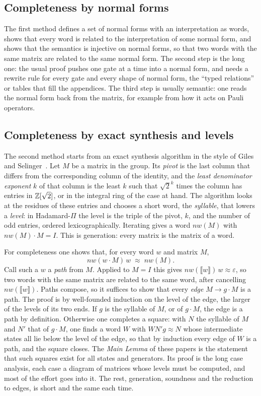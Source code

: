 \subsection{Completeness by normal forms}\label{sec:by-nf}

The first method defines a set of normal forms with an interpretation
as words, shows that every word is related to the interpretation of
some normal form, and shows that the semantics is injective on normal
forms, so that two words with the same matrix are related to the same
normal form. The second step is the long one: the usual proof pushes
one gate at a time into a normal form, and needs a rewrite rule for
every gate and every shape of normal form, the ``typed relations'' or
tables that fill the appendices. The third step is usually semantic:
one reads the normal form back from the matrix, for example from how
it acts on Pauli operators.

\subsection{Completeness by exact synthesis and levels}\label{sec:by-levels}

The second method starts from an exact synthesis algorithm in the style
of Giles and Selinger~\cite{giles2013exact}. Let $M$ be a matrix in the
group. Its \emph{pivot} is the last column that differs from the
corresponding column of the identity, and the \emph{least denominator
exponent} $k$ of that column is the least $k$ such that $\sqrt2^k$ times
the column has entries in $\mathbb{Z}[\sqrt2]$, or in the integral ring of
the case at hand. The algorithm looks at the residues of these
entries and chooses a short word, the \emph{syllable}, that lowers a
\emph{level}: in Hadamard-$\Pi$ the level is the triple of the pivot,
$k$, and the number of odd entries, ordered lexicographically. Iterating
gives a word $\mathit{nw}(M)$ with $\mathit{nw}(M)\cdot M = I$. This is
generation: every matrix is the matrix of a word.

For completeness one shows that, for every word $w$ and matrix $M$,
\[
  \mathit{nw}(w\cdot M) \, w \;\approx\; \mathit{nw}(M).
\]
Call such a $w$ a \emph{path} from $M$. Applied to $M = I$ this gives
$\mathit{nw}(\llbracket w \rrbracket)\, w \approx \varepsilon$, so two
words with the same matrix are related to the same word, after
cancelling $\mathit{nw}(\llbracket w \rrbracket)$. Paths compose, so it suffices to show that every \emph{edge}
$M \to g \cdot M$ is a path. The proof is by well-founded induction on
the level of the edge, the larger of the levels of its two ends. If $g$
is the syllable of $M$, or of $g\cdot M$, the edge is a path by
definition. Otherwise one completes a square: with $N$ the syllable of
$M$ and $N'$ that of $g\cdot M$, one finds a word $W$ with
$W N' g \approx N$ whose intermediate states all lie below the level of
the edge, so that by induction every edge of $W$ is a path, and the
square closes. The \emph{Main Lemma} of these papers is the statement
that such squares exist for all states and generators. Its proof is
the long case analysis, each case a diagram of matrices whose levels
must be computed, and most of the effort goes into it. The rest,
generation, soundness and the reduction to edges, is short and the
same each time.

